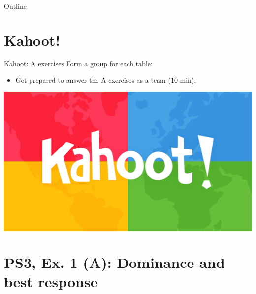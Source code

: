 

\maketitle

\begin{frame}{Outline}
\tableofcontents
\end{frame}


\section{Kahoot!}

\begin{frame}{Kahoot: A exercises}
  Form a group for each table:
  \begin{itemize}
    \item Get prepared to answer the A exercises as a team (10 min).
  \end{itemize}
  \includegraphics[width=\textwidth]{figures/kahoot}
\end{frame}


\section{PS3, Ex. 1 (A): Dominance and best response}

